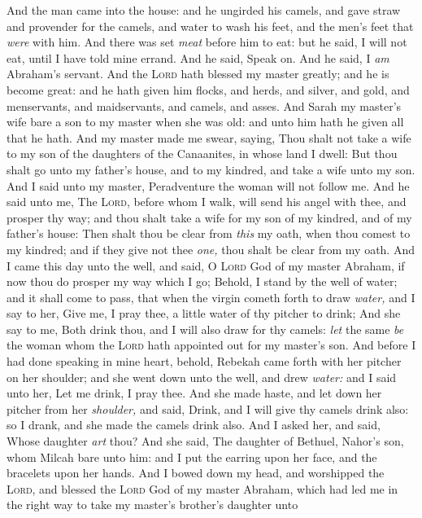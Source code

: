 \documentclass[11pt,letterpaper,oneside]{memoir}
\begin{document}
And the man came into the house: and he ungirded his camels, and gave
straw and provender for the camels, and water to wash his feet, and the
men's feet that \emph{were} with him. And there was set \emph{meat}
before him to eat: but he said, I will not eat, until I have told mine
errand. And he said, Speak on. And he said, I \emph{am} Abraham's
servant. And the \textsc{Lord} hath blessed my master greatly; and he is
become great: and he hath given him flocks, and herds, and silver, and
gold, and menservants, and maidservants, and camels, and asses. And
Sarah my master's wife bare a son to my master when she was old: and
unto him hath he given all that he hath. And my master made me swear,
saying, Thou shalt not take a wife to my son of the daughters of the
Canaanites, in whose land I dwell: But thou shalt go unto my father's
house, and to my kindred, and take a wife unto my son. And I said unto
my master, Peradventure the woman will not follow me. And he said unto
me, The \textsc{Lord}, before whom I walk, will send his angel with thee,
and prosper thy way; and thou shalt take a wife for my son of my
kindred, and of my father's house: Then shalt thou be clear from
\emph{this} my oath, when thou comest to my kindred; and if they give
not thee \emph{one,} thou shalt be clear from my oath. And I came this
day unto the well, and said, O \textsc{Lord} God of my master Abraham, if
now thou do prosper my way which I go; Behold, I stand by the well of
water; and it shall come to pass, that when the virgin cometh forth to
draw \emph{water,} and I say to her, Give me, I pray thee, a little
water of thy pitcher to drink; And she say to me, Both drink thou, and I
will also draw for thy camels: \emph{let} the same \emph{be} the woman
whom the \textsc{Lord} hath appointed out for my master's son. And before
I had done speaking in mine heart, behold, Rebekah came forth with her
pitcher on her shoulder; and she went down unto the well, and drew
\emph{water:} and I said unto her, Let me drink, I pray thee. And she
made haste, and let down her pitcher from her \emph{shoulder,} and said,
Drink, and I will give thy camels drink also: so I drank, and she made
the camels drink also. And I asked her, and said, Whose daughter
\emph{art} thou? And she said, The daughter of Bethuel, Nahor's son,
whom Milcah bare unto him: and I put the earring upon her face, and the
bracelets upon her hands. And I bowed down my head, and worshipped the
\textsc{Lord}, and blessed the \textsc{Lord} God of my master Abraham, which
had led me in the right way to take my master's brother's daughter unto
\end{document}
